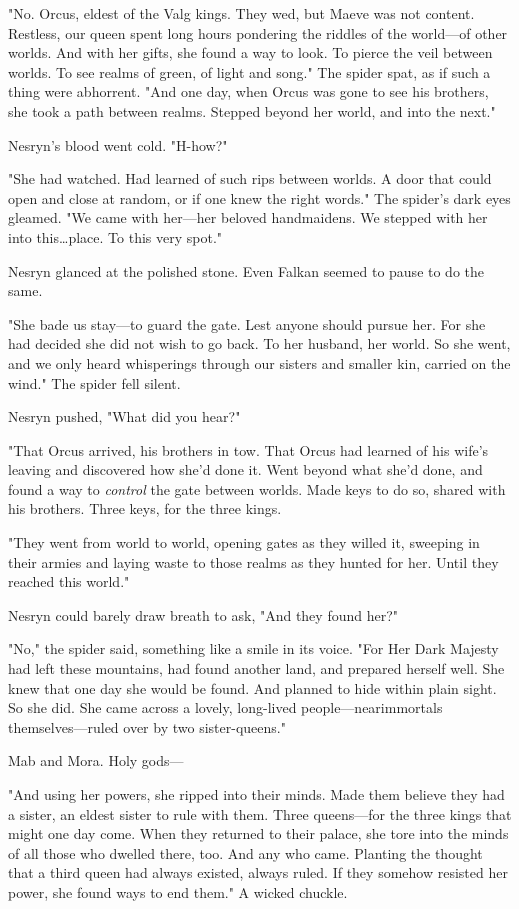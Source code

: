 "No.
Orcus, eldest of the Valg kings.
They wed, but Maeve was not content.
Restless, our queen spent long hours pondering the riddles of the world---of other worlds.
And with her gifts, she found a way to look.
To pierce the veil between worlds.
To see realms of green, of light and song."
The spider spat, as if such a thing were abhorrent.
"And one day, when Orcus was gone to see his brothers, she took a path between realms.
Stepped beyond her world, and into the next."

Nesryn's blood went cold.
"H-how?"

"She had watched.
Had learned of such rips between worlds.
A door that could open and close at random, or if one knew the right words."
The spider's dark eyes gleamed.
"We came with her---her beloved handmaidens.
We stepped with her into this\ldots place.
To this very spot."

Nesryn glanced at the polished stone.
Even Falkan seemed to pause to do the same.

"She bade us stay---to guard the gate.
Lest anyone should pursue her.
For she had decided she did not wish to go back.
To her husband, her world.
So she went, and we only heard whisperings through our sisters and smaller kin, carried on the wind."
The spider fell silent.

Nesryn pushed, "What did you hear?"

"That Orcus arrived, his brothers in tow.
That Orcus had learned of his wife's leaving and discovered how she'd done it.
Went beyond what she'd done, and found a way to \emph{control} the gate between worlds.
Made keys to do so, shared with his brothers.
Three keys, for the three kings.

"They went from world to world, opening gates as they willed it, sweeping in their armies and laying waste to those realms as they hunted for her.
Until they reached this world."

Nesryn could barely draw breath to ask, "And they found her?"

"No," the spider said, something like a smile in its voice.
"For Her Dark Majesty had left these mountains, had found another land, and prepared herself well.
She knew that one day she would be found.
And planned to hide within plain sight.
So she did.
She came across a lovely, long-lived people---nearimmortals themselves---ruled over by two sister-queens."

Mab and Mora.
Holy gods---

"And using her powers, she ripped into their minds.
Made them believe they had a sister, an eldest sister to rule with them.
Three queens---for the three kings that might one day come.
When they returned to their palace, she tore into the minds of all those who dwelled there, too.
And any who came.
Planting the thought that a third queen had always existed, always ruled.
If they somehow resisted her power, she found ways to end them."
A wicked chuckle.

